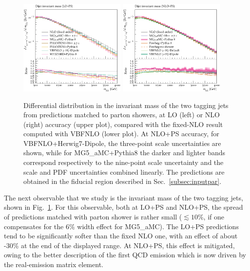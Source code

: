 \documentclass[twocolumn,epjc3]{svjour3} %
\newlength{\width}
\begin{document}
\begin{figure}[hbt]
\centering
\includegraphics[width=0.47\textwidth]{figures/LOPS/m_jj.pdf}
\includegraphics[width=0.47\textwidth]{figures/NLOPS/m_jj.pdf}
\caption{Differential distribution in the
invariant mass of the two tagging jets
from predictions matched to parton showers, at LO (left) or NLO (right) accuracy (upper plot), compared with the fixed-NLO result computed with {\sc VBFNLO} (lower plot). At NLO+PS accuracy, for
    {\sc VBFNLO}+{\sc Herwig7-Dipole}, the three-point scale uncertainties are shown, while for {\sc MG5\_aMC}+{\sc Pythia8} the darker and lighter bands correspond
    respectively to the nine-point scale uncertainty and the scale and PDF uncertainties combined linearly.
    The predictions are obtained in the fiducial region described in Sec.~\protect\ref{subsec:inputpar}.}
\label{fig:PSmjj}
\end{figure}

The next observable that we study is the invariant mass of the two tagging jets, shown in Fig.~\ref{fig:PSmjj}. For this observable, both at LO+PS and NLO+PS,
the spread of predictions matched with parton shower is rather small
($\lesssim 10\%$, if one compensates for the $6\%$ width effect for {\sc MG5\_aMC}).
The LO+PS predictions tend to be significantly softer than the fixed NLO one, with an effect of
about -30\% at the end of the displayed range. At NLO+PS, this effect is mitigated, owing to the better description of the first QCD emission which is now driven by the real-emission matrix element.
\end{document}
